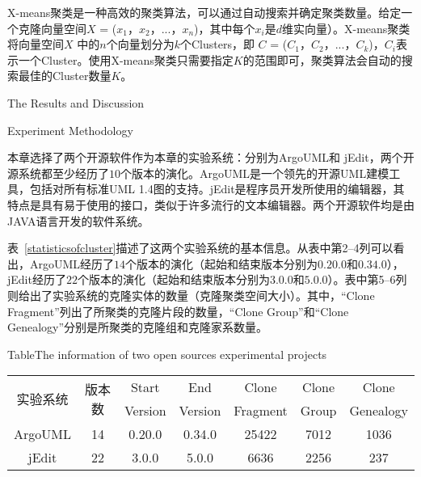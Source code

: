 X-means聚类是一种高效的聚类算法，可以通过自动搜索并确定聚类数量\cite{pelleg2000x}。给定一个克隆向量空间$X$ = {($x_1$，$x_2$，$...$，$x_n$)}，其中每个$x_i$是$d$维实向量）。X-means聚类将向量空间$X$ 中的$n$个向量划分为$k$个Clusters，即 $C$ = {($C_1$，$C_2$，$...$，$C_k$)}，$C_i$表示一个Cluster。使用X-means聚类只需要指定$K$的范围即可，聚类算法会自动的搜索最佳的Cluster数量$K$。



{The Results and Discussion}
\label{ref-characteristics}

{Experiment Methodology}

本章选择了两个开源软件作为本章的实验系统：分别为ArgoUML和 jEdit，两个开源系统都至少经历了$10$个版本的演化。ArgoUML是一个领先的开源UML建模工具，包括对所有标准UML 1.4图的支持。jEdit是程序员开发所使用的编辑器，其特点是具有易于使用的接口，类似于许多流行的文本编辑器。两个开源软件均是由JAVA语言开发的软件系统。

表~\ref{statisticsofcluster}描述了这两个实验系统的基本信息。从表中第2--4列可以看出，ArgoUML经历了$14 $个版本的演化（起始和结束版本分别为$0.20.0$和$0.34.0$）， jEdit经历了$22$个版本的演化（起始和结束版本分别为$3.0.0$和$5.0.0$）。表中第5--6列则给出了实验系统的克隆实体的数量（克隆聚类空间大小）。其中，“Clone Fragment”列出了所聚类的克隆片段的数量，“Clone Group”和“Clone Genealogy”分别是所聚类的克隆组和克隆家系数量。

\begin{table}[htbp]
{Table$\!$}{The information of two open sources experimental projects }
\vspace{0.5em}
\centering 
\wuhao
\begin{tabular}{ccccccc}
\toprule[1.5pt ]
\multirow{2}{*}{实验系统}&\multirow{2}{*}{版本数}&Start&End&Clone&Clone&Clone\\ 
&&Version&Version&Fragment&Group&Genealogy\\
\midrule[1pt]
ArgoUML&14&0.20.0&0.34.0&25422&7012&1036\\ 
jEdit&22&3.0.0&5.0.0&6636&2256	&237\\ 
\bottomrule[1.5pt]
\end{tabular}
\end{table}

